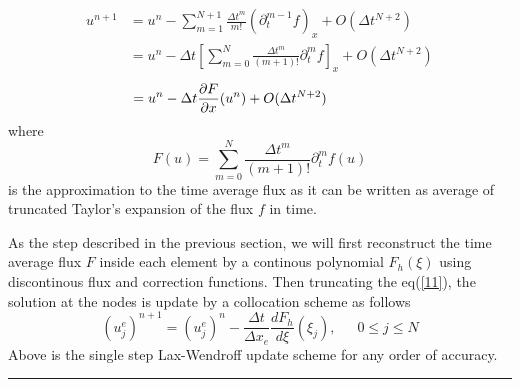 \begin{align*}
    u^{n+1} &= u^n - \sum\limits_{m=1}^{N+1} \frac{\Delta t^m}{m!}(\partial_t^{m-1}f)_x + O(\Delta t^{N+2})\\
    &= u^n - \Delta t\left[\sum\limits_{m=0}^N\frac{\Delta t^m}{(m+1)!}\partial_t^mf \right]_x + O(\Delta t^{N+2})
\end{align*}
\begin{align}
    \hspace{-43pt}= u^n - \Delta t\frac{\partial F}{\partial x}(u^n) + O(\Delta t^{N+2}) \label{11}
\end{align}
where
\begin{equation*}
    F(u) = \sum\limits_{m=0}^N \frac{\Delta t^m}{(m+1)!}\partial_t^mf(u)
\end{equation*}
is the approximation to the time average flux as it can be written as average of truncated Taylor's expansion of the flux $f$ in time. 

As the step described in the previous section, we will first reconstruct the time average flux $F$ inside each element by a continous polynomial $F_h(\xi)$ using discontinous flux and correction functions. Then truncating the eq(\ref{11}), the solution at the nodes is update by a collocation scheme as follows
\begin{equation}
    (u_j^e)^{n+1} = (u_j^e)^n - \frac{\Delta t}{\Delta x_e}\frac{dF_h}{d\xi}(\xi_j), \hspace{18pt} 0 \leq j \leq N
\end{equation}
Above is the single step Lax-Wendroff update scheme for any order of accuracy.

\begin{center}
    \rule{3cm}{1pt}
\end{center}